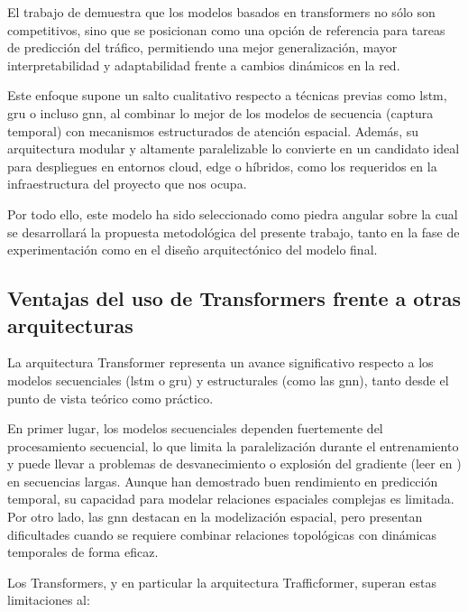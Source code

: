 \vspace{0.5cm}

El trabajo de \cite{trafficformer} demuestra que los modelos basados en transformers no sólo son competitivos, sino que se posicionan como una opción de referencia para tareas de predicción del tráfico, permitiendo una mejor generalización, mayor interpretabilidad y adaptabilidad frente a cambios dinámicos en la red.

Este enfoque supone un salto cualitativo respecto a técnicas previas como \acrshort{lstm}, \acrshort{gru} o incluso \acrshort{gnn}, al combinar lo mejor de los modelos de secuencia (captura temporal) con mecanismos estructurados de atención espacial. Además, su arquitectura modular y altamente paralelizable lo convierte en un candidato ideal para despliegues en entornos cloud, edge o híbridos, como los requeridos en la infraestructura del proyecto que nos ocupa.

Por todo ello, este modelo ha sido seleccionado como piedra angular sobre la cual se desarrollará la propuesta metodológica del presente trabajo, tanto en la fase de experimentación como en el diseño arquitectónico del modelo final.

\subsection{Ventajas del uso de Transformers frente a otras arquitecturas}

La arquitectura Transformer representa un avance significativo respecto a los modelos secuenciales (\acrshort{lstm} o \acrshort{gru}) y estructurales (como las \acrshort{gnn}), tanto desde el punto de vista teórico como práctico.

En primer lugar, los modelos secuenciales dependen fuertemente del procesamiento secuencial, lo que limita la paralelización durante el entrenamiento y puede llevar a problemas de desvanecimiento o explosión del gradiente (leer en \cite{desvGradiente}) en secuencias largas. Aunque han demostrado buen rendimiento en predicción temporal, su capacidad para modelar relaciones espaciales complejas es limitada. Por otro lado, las \acrshort{gnn} destacan en la modelización espacial, pero presentan dificultades cuando se requiere combinar relaciones topológicas con dinámicas temporales de forma eficaz.

Los Transformers, y en particular la arquitectura Trafficformer, superan estas limitaciones al:

